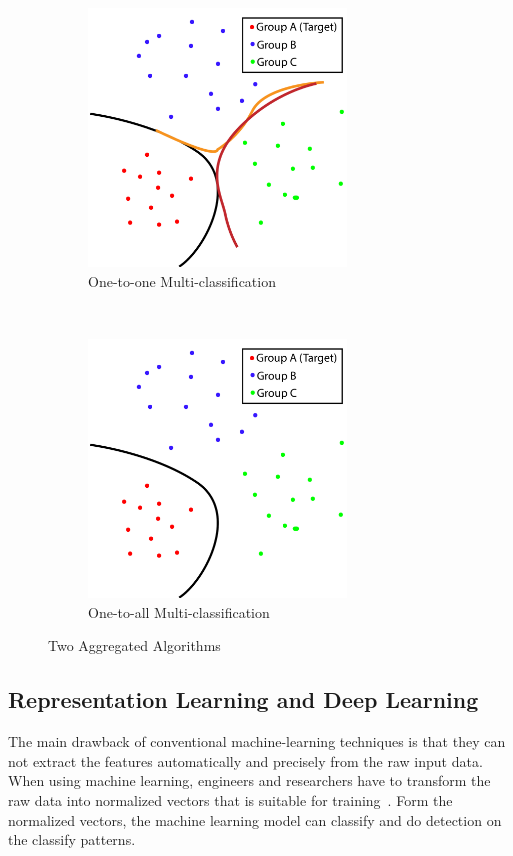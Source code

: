\begin{spacing}{1.5}
\begin{figure}[th]
    \centering
    \begin{subfigure}[b]{0.49\textwidth}
        \centering
        \includegraphics[width=2.7in, fbox]{Chapter2/1to1.pdf}
        \caption{One-to-one Multi-classification}
        \label{fig:121} 
    \end{subfigure}%
    ~
    \begin{subfigure}[b]{0.49\textwidth}
        \centering
        \includegraphics[width=2.7in, fbox]{Chapter2/1toall.pdf}
        \caption{One-to-all Multi-classification}
        \label{fig:12all} 
    \end{subfigure}
    \caption{Two Aggregated Algorithms}
\end{figure}


\subsection{Representation Learning and Deep Learning}

The main drawback of conventional machine-learning techniques is that they can not extract the features automatically and precisely from the raw input data. When using machine learning, engineers and researchers have to transform the raw data into normalized vectors that is suitable for training~\cite{ongsulee2017artificial}. Form the normalized vectors, the machine learning model can classify and do detection on the classify patterns.


\end{spacing}
